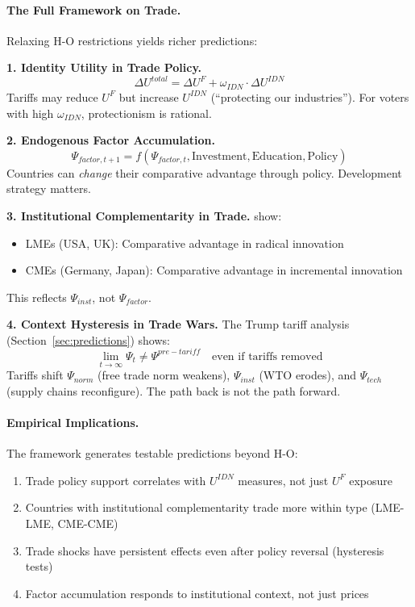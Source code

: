 \documentclass[12pt,a4paper]{article}
\begin{document}
\paragraph{The Full Framework on Trade.}
Relaxing H-O restrictions yields richer predictions:

\textbf{1. Identity Utility in Trade Policy.}
\begin{equation}
  \Delta U^{total} = \Delta U^F + \omega_{IDN} \cdot \Delta U^{IDN}
\end{equation}
Tariffs may reduce $U^F$ but increase $U^{IDN}$ (``protecting our industries'').
For voters with high $\omega_{IDN}$, protectionism is rational.

\textbf{2. Endogenous Factor Accumulation.}
\begin{equation}
  \Psi_{factor,t+1} = f(\Psi_{factor,t}, \text{Investment}, \text{Education}, \text{Policy})
\end{equation}
Countries can \emph{change} their comparative advantage through policy.
Development strategy matters.

\textbf{3. Institutional Complementarity in Trade.}
\citet{hallsoskice2001} show:
\begin{itemize}
  \item LMEs (USA, UK): Comparative advantage in radical innovation
  \item CMEs (Germany, Japan): Comparative advantage in incremental innovation
\end{itemize}
This reflects $\Psi_{inst}$, not $\Psi_{factor}$.

\textbf{4. Context Hysteresis in Trade Wars.}
The Trump tariff analysis (Section~\ref{sec:predictions}) shows:
\begin{equation}
  \lim_{t \to \infty} \Psi_t \neq \Psi^{pre-tariff} \quad \text{even if tariffs removed}
\end{equation}
Tariffs shift $\Psi_{norm}$ (free trade norm weakens), $\Psi_{inst}$ (WTO erodes),
and $\Psi_{tech}$ (supply chains reconfigure). The path back is not the path forward.

\paragraph{Empirical Implications.}
The framework generates testable predictions beyond H-O:
\begin{enumerate}
  \item Trade policy support correlates with $U^{IDN}$ measures, not just $U^F$ exposure
  \item Countries with institutional complementarity trade more within type (LME-LME, CME-CME)
  \item Trade shocks have persistent effects even after policy reversal (hysteresis tests)
  \item Factor accumulation responds to institutional context, not just prices
\end{enumerate}
\end{document}
